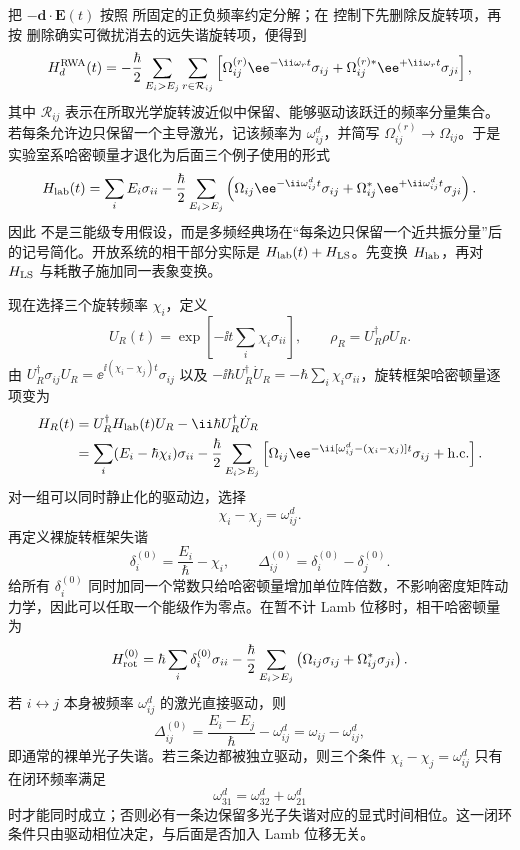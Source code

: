 把 $-\mathbf d\cdot\mathbf E(t)$ 按照 所固定的正负频率约定分解；在 控制下先删除反旋转项，再按 删除确实可微扰消去的远失谐旋转项，便得到
\[
H_d^{\rm RWA}(t)
=-\frac{\hbar}{2}
\sum_{E_i>E_j}\sum_{r\in\mathcal R_{ij}}
\left[
\Omega_{ij}^{(r)}\ee^{-\ii\omega_rt}\sigma_{ij}
+\Omega_{ij}^{(r)*}\ee^{+\ii\omega_rt}\sigma_{ji}
\right],
\]
其中 $\mathcal R_{ij}$ 表示在所取光学旋转波近似中保留、能够驱动该跃迁的频率分量集合。若每条允许边只保留一个主导激光，记该频率为 $\omega_{ij}^{d}$，并简写 $\Omega_{ij}^{(r)}\to\Omega_{ij}$。于是实验室系哈密顿量才退化为后面三个例子使用的形式
\begin{equation}
H_{\rm lab}(t)
=\sum_iE_i\sigma_{ii}
-\frac{\hbar}{2}\sum_{E_i>E_j}
\left(
\Omega_{ij}\ee^{-\ii\omega_{ij}^{d}t}\sigma_{ij}
+\Omega_{ij}^*\ee^{+\ii\omega_{ij}^{d}t}\sigma_{ji}
\right).
\label{eq:phys-oqs-three-drive-lab}
\end{equation}
因此 不是三能级专用假设，而是多频经典场在“每条边只保留一个近共振分量”后的记号简化。开放系统的相干部分实际是
\(H_{\rm lab}(t)+H_{\rm LS}\)。先变换 \(H_{\rm lab}\)，再对
\(H_{\rm LS}\) 与耗散子施加同一表象变换。

现在选择三个旋转频率 $\chi_i$，定义
\[
U_R(t)=\exp\!\left[-\ii t\sum_i\chi_i\sigma_{ii}\right],
\qquad
\rho_R=U_R^\dagger\rho U_R.
\]
由 $U_R^\dagger\sigma_{ij}U_R=
\ee^{\ii(\chi_i-\chi_j)t}\sigma_{ij}$ 以及
$-\ii\hbar U_R^\dagger\dot U_R=-\hbar\sum_i\chi_i\sigma_{ii}$，旋转框架哈密顿量逐项变为
\begin{align}
H_R(t)
&=U_R^\dagger H_{\rm lab}(t)U_R
-\ii\hbar U_R^\dagger\dot U_R\\
&=\sum_i(E_i-\hbar\chi_i)\sigma_{ii}
-\frac{\hbar}{2}\sum_{E_i>E_j}
\left[
\Omega_{ij}
\ee^{-\ii[\omega_{ij}^{d}-(\chi_i-\chi_j)]t}\sigma_{ij}
+\mathrm{h.c.}
\right].
\label{eq:phys-oqs-three-drive-transform}
\end{align}
对一组可以同时静止化的驱动边，选择
\[
\chi_i-\chi_j=\omega_{ij}^{d}.
\]
再定义裸旋转框架失谐
\[
\delta_i^{(0)}=\frac{E_i}{\hbar}-\chi_i,
\qquad
\Delta_{ij}^{(0)}=\delta_i^{(0)}-\delta_j^{(0)}.
\]
给所有 $\delta_i^{(0)}$ 同时加同一个常数只给哈密顿量增加单位阵倍数，不影响密度矩阵动力学，因此可以任取一个能级作为零点。在暂不计 Lamb 位移时，相干哈密顿量为
\[
H_{\rm rot}^{(0)}
=\hbar\sum_i\delta_i^{(0)}\sigma_{ii}
-\frac{\hbar}{2}\sum_{E_i>E_j}
\left(\Omega_{ij}\sigma_{ij}+\Omega_{ij}^*\sigma_{ji}\right).
\]
若 $i\leftrightarrow j$ 本身被频率 $\omega_{ij}^{d}$ 的激光直接驱动，则
\[
\Delta_{ij}^{(0)}
=\frac{E_i-E_j}{\hbar}-\omega_{ij}^{d}
=\omega_{ij}-\omega_{ij}^{d},
\]
即通常的裸单光子失谐。若三条边都被独立驱动，则三个条件 $\chi_i-\chi_j=\omega_{ij}^{d}$ 只有在闭环频率满足
\[
\omega_{31}^{d}=\omega_{32}^{d}+\omega_{21}^{d}
\]
时才能同时成立；否则必有一条边保留多光子失谐对应的显式时间相位。这一闭环条件只由驱动相位决定，与后面是否加入 Lamb 位移无关。

